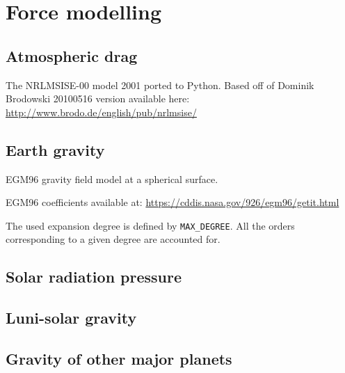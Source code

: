 \documentclass[11pt,a4paper,oneside]{report}
\begin{document}
\chapter{Force modelling}

\section{Atmospheric drag}
The NRLMSISE-00 model 2001 ported to Python. Based off of Dominik Brodowski 20100516 version available here: \textcolor{blue}{\url{http://www.brodo.de/english/pub/nrlmsise/}}

\section{Earth gravity}
EGM96 gravity field model at a spherical surface.

EGM96 coefficients available at: \textcolor{blue}{\url{https://cddis.nasa.gov/926/egm96/getit.html}}

The used expansion degree is defined by \verb|MAX_DEGREE|. All the orders corresponding to a given degree are accounted for.

\section{Solar radiation pressure}

\section{Luni-solar gravity}

\section{Gravity of other major planets}

\end{document}
